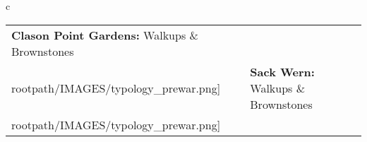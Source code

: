 \begin{table}[H]
        \begin{tabular}{c}
        \begin{tabular}{m{1.25in} m{2in} m{.1in} m{1.25in} m{2in}}
\textbf{Clason Point Gardens:} {Walkups \& Brownstones} & \texttt{[image: \\rootpath/IMAGES/typology\_prewar.png]} & & \textbf{Sack Wern:} {Walkups \& Brownstones} & \texttt{[image: \\rootpath/IMAGES/typology\_prewar.png]}
\end{tabular}\end{tabular}
        \end{table}